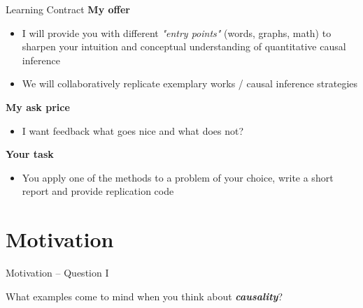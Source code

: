 \documentclass[aspectratio=169]{beamer}
\begin{document}

	\begin{frame}{Learning Contract}
		\textbf{My offer}
		\begin{itemize}
			\item I will provide you with different \textit{"entry points"} (words, graphs, math) to sharpen your intuition and conceptual understanding of quantitative causal inference
			\item We will collaboratively replicate exemplary works / causal inference strategies
		\end{itemize}
		\vspace*{.25cm}
		\textbf{My ask price}
		\begin{itemize}
			\item I want feedback what goes nice and what does not?
		\end{itemize}
		\vspace*{.25cm}
		\textbf{Your task}
		\begin{itemize}
			\item You apply one of the methods to a problem of your choice, write a short report and provide replication code
		\end{itemize}
	\end{frame}


\section{Motivation}

	\begin{frame}{Motivation -- Question I}
		\begin{center}
			What examples come to mind when you think about \textit{\textbf{causality}}?
		\end{center}
	\end{frame}


\end{document}

